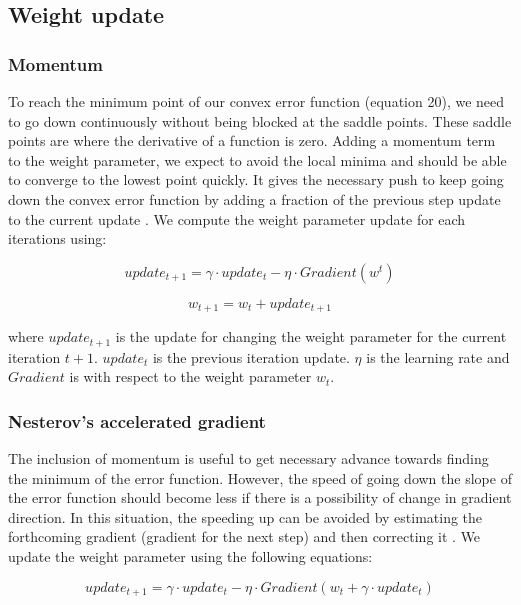\subsection{Weight update}
\subsubsection{Momentum}
To reach the minimum point of our convex error function (equation 20), we need to go down continuously without being blocked at the saddle points. These saddle points are where the derivative of a function is zero. Adding a momentum term to the weight parameter, we expect to avoid the local minima and should be able to converge to the lowest point quickly. It gives the necessary push to keep going down the convex error function by adding a fraction of the previous step update to the current update \cite{articleRuderS, Sutskever}. We compute the weight parameter update for each iterations using:

\begin{equation}
update_{t+1} = \gamma \cdot update_{t} - \eta \cdot Gradient(w^t)
\end{equation}

\begin{equation}
w_{t+1} = w_t + update_{t+1}
\end{equation}

where $update_{t+1}$ is the update for changing the weight parameter for the current iteration $t+1$. $update_{t}$ is the previous iteration update. $\eta$ is the learning rate and $Gradient$ is with respect to the weight parameter $w_t$. 

\subsubsection{Nesterov’s accelerated gradient}
The inclusion of momentum is useful to get necessary advance towards finding the minimum of the error function. However, the speed of going down the slope of the error function should become less if there is a possibility of change in gradient direction. In this situation, the speeding up can be avoided by estimating the forthcoming gradient (gradient for the next step) and then correcting it \cite{Botev}. We update the weight parameter using the following equations:

\begin{equation}
update_{t+1} = \gamma \cdot update_t - \eta \cdot Gradient(w_t + \gamma \cdot update_t)
\end{equation}

